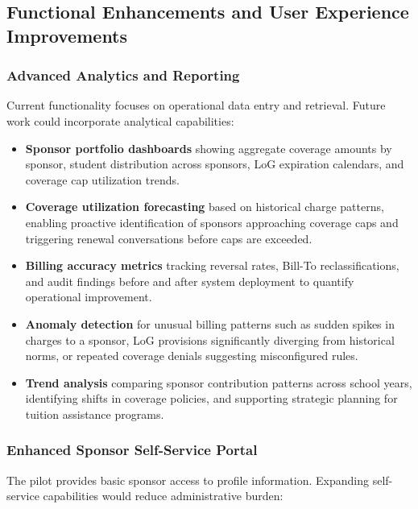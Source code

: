 \subsection{Functional Enhancements and User Experience Improvements}

\subsubsection{Advanced Analytics and Reporting}

Current functionality focuses on operational data entry and retrieval. Future work could incorporate analytical capabilities:

\begin{itemize}
    \item \textbf{Sponsor portfolio dashboards} showing aggregate coverage amounts by sponsor, student distribution across sponsors, LoG expiration calendars, and coverage cap utilization trends.
    \item \textbf{Coverage utilization forecasting} based on historical charge patterns, enabling proactive identification of sponsors approaching coverage caps and triggering renewal conversations before caps are exceeded.
    \item \textbf{Billing accuracy metrics} tracking reversal rates, Bill-To reclassifications, and audit findings before and after system deployment to quantify operational improvement.
    \item \textbf{Anomaly detection} for unusual billing patterns such as sudden spikes in charges to a sponsor, LoG provisions significantly diverging from historical norms, or repeated coverage denials suggesting misconfigured rules.
    \item \textbf{Trend analysis} comparing sponsor contribution patterns across school years, identifying shifts in coverage policies, and supporting strategic planning for tuition assistance programs.
\end{itemize}

\subsubsection{Enhanced Sponsor Self-Service Portal}

The pilot provides basic sponsor access to profile information. Expanding self-service capabilities would reduce administrative burden:


